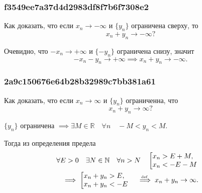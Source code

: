 \documentclass[11pt, a5paper]{article}
\newenvironment{note}[1]{\goodbreak\par\subsubsection{\hfill \color{lightgray}\tiny #1}}{}
\newenvironment{cloze}[2][\ldots]{\begin{leftbar}}{\end{leftbar}}
\begin{document}
    \begin{note}{f3549ee7a37d4d2983df8f7b6f7308e2}
        Как доказать, что если \( x_n \to -\infty \) и \( \{ y_n \} \) ограничена сверху, то \[
            x_n + y_n \to -\infty?
        \]

        \begin{cloze}{1}
            Очевидно, что \( -x_n \to +\infty  \) и \( \{ -y_n \} \)  ограничена снизу, значит \[
                -x_n - y_n \to +\infty \implies x_n + y_n \to -\infty.
            \]
        \end{cloze}
    \end{note}

    \begin{note}{2a9c150676e64b28b32989c7bb381a61}
        Как доказать, что если \( x_n \to \infty  \) и \( \{ y_n \} \) ограниченна, что \[
            x_n + y_n \to \infty?
        \]

        \begin{cloze}{1}
            \( \{ y_n \} \) ограничена \( \implies \exists M \in \mathbb R \quad \forall n \quad -M < y_n < M. \)

            Тогда из определения предела
            \begin{multline*}
                \forall E > 0 \quad \exists N \in \mathbb N \quad \forall n > N \quad \left[ {
                    \begin{array}{@{}l@{\quad}l@{}}
                        x_n > E + M, \\
                        x_n < -E - M
                    \end{array}
                } \right. \\
                \implies \left[ {
                    \begin{array}{@{}l@{\quad}l@{}}
                        x_n + y_n > E, \\
                        x_n + y_n < -E
                    \end{array}
                } \right.
                \overset{\!\!\text{\tiny def}}\implies x_n + y_n \to \infty.
            \end{multline*}
        \end{cloze}
    \end{note}
\end{document}
